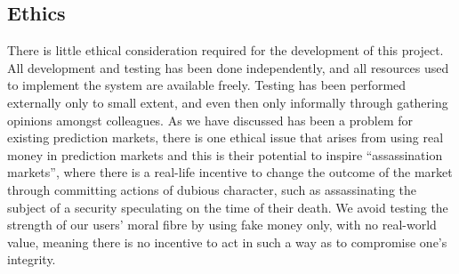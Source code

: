 

\subsection{Ethics}

There is little ethical consideration required for the development of this
project. All development and testing has been done independently, and all
resources used to implement the system are available freely. Testing has been
performed externally only to small extent, and even then only informally
through gathering opinions amongst colleagues. As we have discussed has been a
problem for existing prediction markets, there is one ethical issue that arises
from using real money in prediction markets and this is their potential to
inspire ``assassination markets'', where there is a real-life incentive to
change the outcome of the market through committing actions of dubious
character, such as assassinating the subject of a security speculating on the
time of their death. We avoid testing the strength of our users' moral fibre by
using fake money only, with no real-world value, meaning there is no incentive
to act in such a way as to compromise one's integrity.

